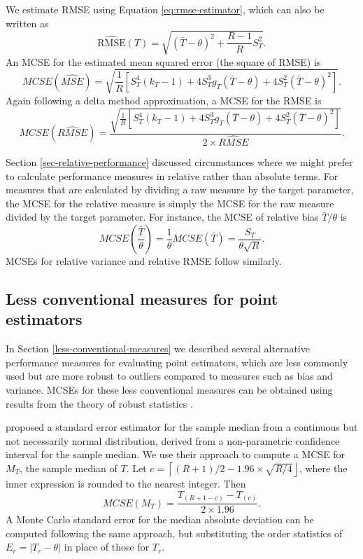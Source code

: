 \documentclass[
]{book}
\newcommand{\RMSE}{\text{RMSE}}
\begin{document}
We estimate RMSE using Equation \eqref{eq:rmse-estimator}, which can also be written as
\[
\widehat{\RMSE}(T) = \sqrt{(\bar{T} - \theta)^2 + \frac{R - 1}{R} S_T^2}.
\]
An MCSE for the estimated mean squared error (the square of RMSE) is
\[ 
MCSE( \widehat{MSE} ) = \sqrt{\frac{1}{R}\left[S_T^4 (k_T - 1) + 4 S_T^3 g_T\left(\bar{T} - \theta\right) + 4 S_T^2 \left(\bar{T} - \theta\right)^2\right]}.
\label{eq:MCSE-MSE}
\]
Again following a delta method approximation, a MCSE for the RMSE is
\[
MCSE( \widehat{RMSE} ) = \frac{\sqrt{\frac{1}{R}\left[S_T^4 (k_T - 1) + 4 S_T^3 g_T\left(\bar{T} - \theta\right) + 4 S_T^2 \left(\bar{T} - \theta\right)^2\right]}}{2 \times \widehat{RMSE}}.
\label{eq:MCSE-RMSE}
\]

Section \ref{sec-relative-performance} discussed circumstances where we might prefer to calculate performance measures in relative rather than absolute terms.
For measures that are calculated by dividing a raw measure by the target parameter, the MCSE for the relative measure is simply the MCSE for the raw measure divided by the target parameter.
For instance, the MCSE of relative bias \(\bar{T} / \theta\) is
\[ 
MCSE\left( \frac{\bar{T}}{\theta} \right) = \frac{1}{\theta} MCSE(\bar{T}) = \frac{S_T}{\theta \sqrt{R}}.
\label{eq:MCSE-relative-bias}
\]
MCSEs for relative variance and relative RMSE follow similarly.

\subsection{Less conventional measures for point estimators}\label{less-conventional-measures-for-point-estimators}

In Section \ref{less-conventional-measures} we described several alternative performance measures for evaluating point estimators, which are less commonly used but are more robust to outliers compared to measures such as bias and variance.
MCSEs for these less conventional measures can be obtained using results from the theory of robust statistics \citep{Hettmansperger2010robust, Maronna2006robust}.

\citet{McKean1984comparison} proposed a standard error estimator for the sample median from a continuous but not necessarily normal distribution, derived from a non-parametric confidence interval for the sample median.
We use their approach to compute a MCSE for \(M_T\), the sample median of \(T\).
Let \(c = \left\lceil(R + 1) / 2 - 1.96 \times \sqrt{R/4}\right\rfloor\), where the inner expression is rounded to the nearest integer.
Then
\[
MCSE\left(M_T\right) = \frac{T_{(R + 1 - c)} - T_{(c)}}{2 \times 1.96}.
\label{eq:MCSE-median}
\]
A Monte Carlo standard error for the median absolute deviation can be computed following the same approach, but substituting the order statistics of \(E_r = | T_r - \theta|\) in place of those for \(T_r\).
\end{document}
